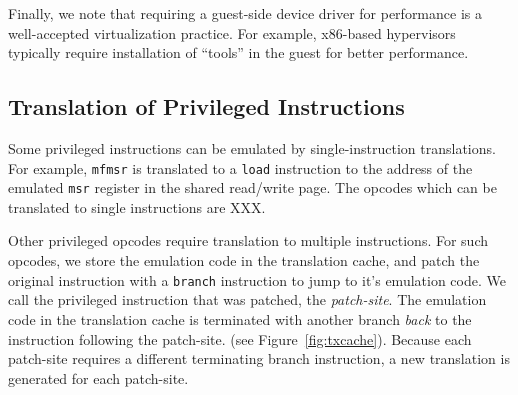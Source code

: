 \documentclass[10pt,twocolumn]{article}
\begin{document}
Finally, we note that requiring a guest-side device driver for performance
is a well-accepted virtualization practice. For example, x86-based hypervisors
typically require installation of ``tools'' in the guest for better performance.

\subsection{Translation of Privileged Instructions}
Some privileged instructions can
be emulated by single-instruction translations. For example, {\tt mfmsr} is translated
to a {\tt load} instruction to the address of the emulated {\tt msr}
register in the shared read/write page. The opcodes which can be
translated to single instructions are XXX.

Other privileged opcodes require translation to multiple instructions.
For such opcodes, we store the emulation code in the translation cache, and
patch the original instruction with a {\tt branch} instruction to jump to it's
emulation code. We call the privileged instruction
that was patched, the {\em patch-site}. The emulation code in the
translation cache is terminated
with another branch {\em back} to the instruction following the patch-site.
(see Figure~\ref{fig:txcache}). Because each patch-site requires a different
terminating branch instruction, a new translation is generated for
each patch-site.

\end{document}
